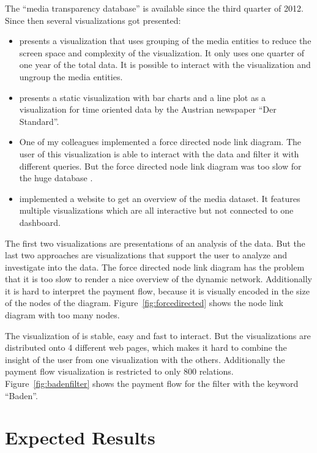 \documentclass{acmsiggraph}               %
\begin{document}
The ``media transparency database'' is available since the third quarter of 2012. Since then several visualizations got presented:
\begin{itemize}
  \item \cite{paroli2} presents a visualization that uses grouping of the media entities to reduce the screen space and complexity of the visualization. It only uses one quarter of one year of the total data. It is possible to interact with the visualization and ungroup the media entities.
  \item \cite{standard} presents a static visualization with bar charts and a line plot as a visualization for time oriented data by the Austrian newspaper ``Der Standard''.
  \item One of my colleagues implemented a force directed node link diagram. The user of this visualization is able to interact with the data and filter it with different queries. But the force directed node link diagram was too slow for the huge database \cite{Schrempf2014}. 
  \item \cite{fhMedien} implemented a website to get an overview of the media dataset. It features multiple visualizations which are all interactive but not connected to one dashboard.
\end{itemize}
The first two visualizations are presentations of an analysis of the data. But the last two approaches are visualizations that support the user to analyze and investigate into the data. The force directed node link diagram has the problem that it is too slow to render a nice overview of the dynamic network. Additionally it is hard to interpret the payment flow, because it is visually encoded in the size of the nodes of the diagram. Figure~\ref{fig:forcedirected} shows the node link diagram with too many nodes.
\par
The visualization of \cite{fhMedien} is stable, easy and fast to interact. But the visualizations are distributed onto 4 different web pages, which makes it hard to combine the insight of the user from one visualization with the others. Additionally the payment flow visualization is restricted to only 800 relations. Figure~\ref{fig:badenfilter} shows the payment flow for the filter with the keyword ``Baden''.
 

\section{Expected Results} %
\label{sec:expected_results}
\end{document}
